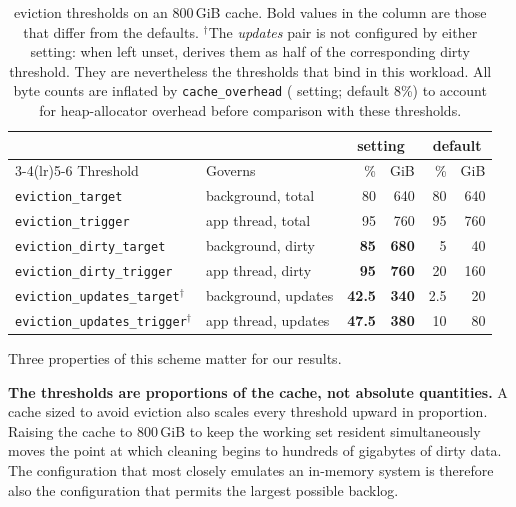 \begin{table}[t]
  \centering
  \setlength{\tabcolsep}{4pt}\renewcommand{\arraystretch}{1.05}
  \small
  \begin{tabular}{l l rr rr}
  \toprule
   & & \multicolumn{2}{c}{\project{} setting} & \multicolumn{2}{c}{\wt{} default} \\
  \cmidrule(lr){3-4}\cmidrule(lr){5-6}
  Threshold & Governs & \% & GiB & \% & GiB \\
  \midrule
  \texttt{eviction\_target}          & background, total  & 80   & 640 & 80 & 640 \\
  \texttt{eviction\_trigger}         & app thread, total & 95   & 760 & 95 & 760 \\
  \texttt{eviction\_dirty\_target}   & background, dirty  & \textbf{85}   & \textbf{680} & 5  & 40  \\
  \texttt{eviction\_dirty\_trigger}  & app thread, dirty & \textbf{95}   & \textbf{760} & 20 & 160 \\
  \texttt{eviction\_updates\_target}$^\dagger$  & background, updates & \textbf{42.5} & \textbf{340} & 2.5 & 20 \\
  \texttt{eviction\_updates\_trigger}$^\dagger$ & app thread, updates & \textbf{47.5} & \textbf{380} & 10 & 80 \\
  \bottomrule
  \end{tabular}
  \caption{\wt{} eviction thresholds on an 800\,GiB cache.
  Bold values in the \project{} column are those that differ from the \wt{} defaults.
  $^\dagger$The
  \emph{updates} pair is not configured by either setting: when left unset, \wt{} derives them as half of the corresponding dirty threshold. They are
  nevertheless the thresholds that bind in this workload. All byte counts are inflated by \texttt{cache\_overhead} (\wt{} setting; default 8\%) to account for heap-allocator overhead before comparison with these thresholds.}
  \label{tab:wt-eviction-knobs}
\end{table}

Three properties of this scheme matter for our results.

\textbf{The thresholds are proportions of the cache, not absolute quantities.}
A cache sized to avoid eviction also scales every threshold upward in proportion.
Raising the cache to 800\,GiB to keep the working set resident simultaneously moves the point at which cleaning begins to hundreds of gigabytes of dirty data.
The configuration that most closely emulates an in-memory system is therefore also the configuration that permits the largest possible backlog.

